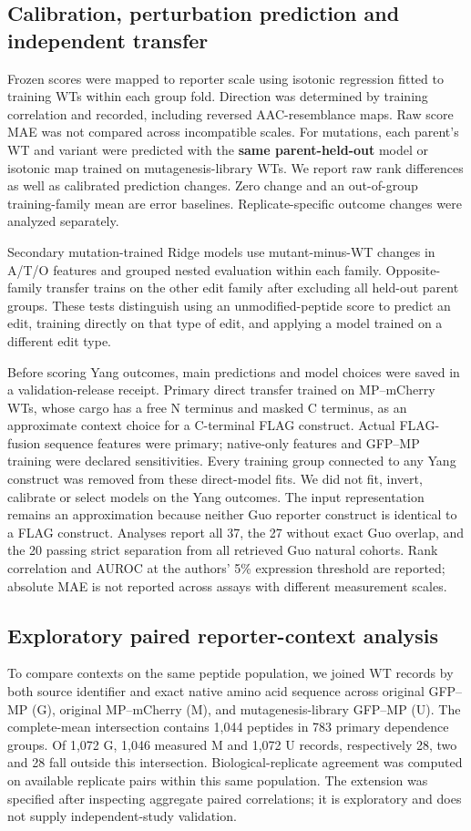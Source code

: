 \documentclass[11pt,a4paper]{article}
\begin{document}
\subsection{Calibration, perturbation prediction and independent transfer}
Frozen scores were mapped to reporter scale using isotonic regression fitted
to training WTs within each group fold. Direction was determined by training
correlation and recorded, including reversed AAC-resemblance maps. Raw score
MAE was not compared across incompatible scales. For mutations, each parent's
WT and variant were predicted with the \textbf{same parent-held-out} model or
isotonic map trained on mutagenesis-library WTs. We report raw rank differences
as well as calibrated prediction changes. Zero change and an out-of-group
training-family mean are error baselines. Replicate-specific outcome changes
were analyzed separately.

Secondary mutation-trained Ridge models use mutant-minus-WT changes in A/T/O
features and grouped nested evaluation within each family. Opposite-family
transfer trains on the other edit family after excluding all held-out parent
groups. These tests distinguish using an unmodified-peptide score to predict an edit, training directly on that type of edit, and applying a model trained on a different edit type.

Before scoring Yang outcomes, main predictions and model choices were saved
in a validation-release receipt. Primary direct transfer trained on MP--mCherry
WTs, whose cargo has a free N terminus and masked C terminus, as an approximate
context choice for a C-terminal FLAG construct. Actual FLAG-fusion sequence
features were primary; native-only features and GFP--MP training were declared
sensitivities. Every training group connected to any Yang construct was removed
from these direct-model fits. We did not fit, invert, calibrate or select models
on the Yang outcomes. The input representation remains an approximation because neither Guo reporter construct is identical to a FLAG construct. Analyses report all
37, the 27 without exact Guo overlap, and the 20 passing strict separation from
all retrieved Guo natural cohorts. Rank correlation and AUROC at the authors'
5\% expression threshold are reported; absolute MAE is not reported across assays with different measurement scales.


\subsection{Exploratory paired reporter-context analysis}
To compare contexts on the same peptide population, we joined WT records by
both source identifier and exact native amino acid sequence across original
GFP--MP (G), original MP--mCherry (M), and mutagenesis-library GFP--MP (U).
The complete-mean intersection contains 1,044 peptides in 783 primary
dependence groups. Of 1,072 G, 1,046 measured M and 1,072 U records, respectively
28, two and 28 fall outside this intersection. Biological-replicate agreement
was computed on available replicate pairs within this same population.
The extension was specified after inspecting aggregate paired correlations;
it is exploratory and does not supply independent-study validation.
\end{document}
